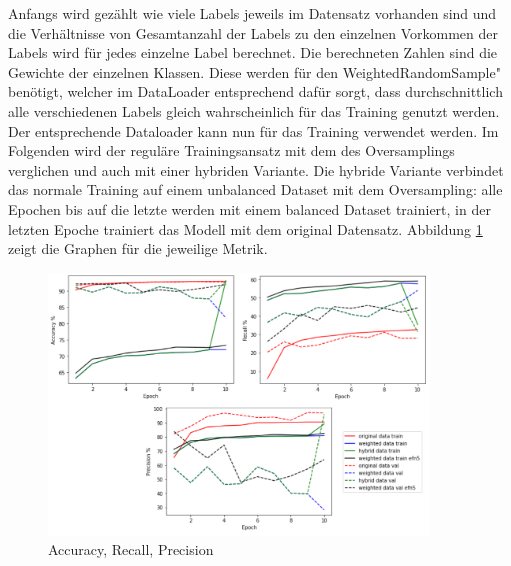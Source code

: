 \documentclass[12pt, a4paper]{article}
\begin{document}
Anfangs wird gezählt wie viele Labels jeweils im Datensatz vorhanden sind und die Verhältnisse von Gesamtanzahl der Labels zu den einzelnen Vorkommen der Labels wird für jedes einzelne Label berechnet. Die berechneten Zahlen sind die Gewichte der einzelnen Klassen. Diese werden für den WeightedRandomSample" benötigt, welcher im DataLoader entsprechend dafür sorgt, dass durchschnittlich alle verschiedenen Labels gleich wahrscheinlich für das Training genutzt werden. Der entsprechende Dataloader kann nun für das Training verwendet werden. Im Folgenden wird der reguläre Trainingsansatz mit dem des Oversamplings verglichen und auch mit einer hybriden Variante. Die hybride Variante verbindet das normale Training auf einem unbalanced Dataset mit dem Oversampling: alle Epochen bis auf die letzte werden mit einem balanced Dataset trainiert, in der letzten Epoche trainiert das Modell mit dem original Datensatz. Abbildung \ref{fig:arp} zeigt die Graphen für die jeweilige Metrik.

\begin{figure}[t]
\centering
\includegraphics[width=0.9\textwidth]{metrics-acc-recall-prec.png}
\caption{Accuracy, Recall, Precision}
\label{fig:arp}
\end{figure}
\end{document}
